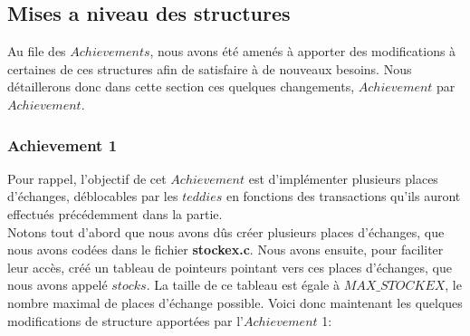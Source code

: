 \documentclass{article}
\begin{document}
\subsection{Mises a niveau des structures}
Au file des $Achievements$, nous avons été amenés à apporter des modifications à certaines de ces structures afin de satisfaire à de nouveaux besoins. Nous détaillerons donc dans cette section ces quelques changements, $Achievement$ par $Achievement$.

\subsubsection{Achievement 1}
Pour rappel, l'objectif de cet $Achievement$ est d'implémenter plusieurs places d'échanges, déblocables par les $teddies$ en fonctions des transactions qu'ils auront effectués précédemment dans la partie.\\
Notons tout d'abord que nous avons dûs créer plusieurs places d'échanges, que nous avons codées dans le fichier \textbf{stockex.c}. Nous avons ensuite, pour faciliter leur accès, créé un tableau de pointeurs pointant vers ces places d'échanges, que nous avons appelé $stocks$. La taille de ce tableau est égale à $MAX\_STOCKEX$, le nombre maximal de places d'échange possible. Voici donc maintenant les quelques modifications de structure apportées par l'$Achievement$ 1:
\end{document}
